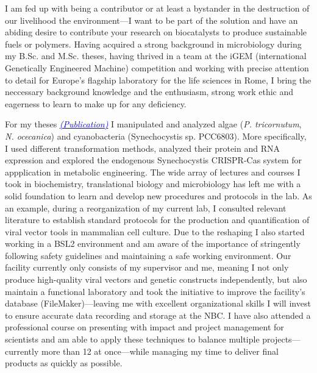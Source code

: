\documentclass[11pt,a4paper,sans]{moderncv}
\begin{document}

       
\makelettertitle
\begin{spacing}{1.15}

I am fed up with being a contributor or at least a bystander in the destruction of our livelihood the environment---I want to be part of the solution and have an abiding desire to contribute your research on biocatalysts to produce sustainable fuels or polymers.
Having acquired a strong background in microbiology during my B.Sc. and M.Sc. theses, having thrived in a team at the iGEM (international Genetically Engineered Machine) competition and working with precise attention to detail for Europe's flagship laboratory for the life sciences in Rome, I bring the neccessary background knowledge and the enthusiasm, strong work ethic and eagerness to learn to make up for any deficiency. 
\par\vspace*{1mm} %

For my theses {\href{https://www.ncbi.nlm.nih.gov/pubmed/29517395}{\textcolor{blue}{{\textit{(Publication)}}}}} I manipulated and analyzed algae (\textit{P. tricornutum}, \textit{N. ocecanica}) and cyanobacteria (Synechocystis sp. PCC6803). 
More specifically, I used different transformation methods, analyzed their protein and RNA expression and explored the endogenous Synechocystis CRISPR-Cas system for appplication in metabolic engineering. 
The wide array of lectures and courses I took in biochemistry, translational biology and microbiology has  left me with a solid foundation to learn and develop new procedures and protocols in the lab. 
As an example, during a reorganization of my current lab, I consulted relevant literature to establish standard protocols for the production and quantification of viral vector tools in mammalian cell culture. 
Due to the reshaping I also started working in a BSL2 environment and am aware of the importance of stringently following safety guidelines and maintaining a safe working environment. 
Our facility currently only consists of my supervisor and me, meaning I not only produce high-quality viral vectors and genetic constructs independently, but also maintain a functional laboratory and took the initiative to improve the facility's database (FileMaker)---leaving me with excellent organizational skills I will invest to ensure accurate data recording and storage at the NBC.  
I have also attended a professional course on presenting with impact and project management for scientists and am able to apply these techniques to balance multiple projects---currently more than 12 at once---while managing my time to deliver final products as quickly as possible.


\end{spacing}
\end{document}
